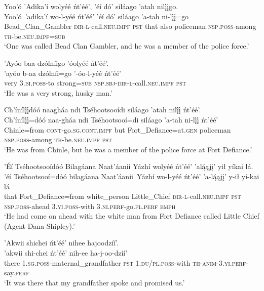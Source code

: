 \ea\label{ex:text1-17-3}
Yoo’ó ’Adika’í wolyéé ńt’éé’, ’éí dó’ siláago ’atah nilį́įgo.\\
\gll Yoo’ó~{’adika’í}	wo-l-yéé	ńt’éé’	’éí	dó’	siláago	’a-tah	ni-lį́į=go\\
     Bead\_Clan\_Gambler	\textsc{dir}-\textsc{l}-call.\textsc{neu}.\textsc{impf}	\textsc{pst}	that	also	policeman	\textsc{nsp}.\textsc{poss}-among	\textsc{th}-be.\textsc{neu}.\textsc{impf}=\textsc{sub}\\
\glt `One was called Bead Clan Gambler, and he was a member of the police force.'
\z

\ea\label{ex:text1-17-4}
’Ayóo baa dzólníigo ’óolyéé ńt’éé’.\\
\gll ’ayóo	b-aa	dzólníi=go	’-óo-l-yéé	ńt’éé’\\
     very	3.\textsc{bi}.\textsc{poss}-to	strong=\textsc{sub}	\textsc{nsp}.\textsc{sbj}-\textsc{dir}-\textsc{l}-call.\textsc{neu}.\textsc{impf}	\textsc{pst}\\
\glt `He was a very strong, husky man.'
\z

\newpage
\ea\label{ex:text1-17-5}
Ch’ínílį́į́dóó naagháa ndi Tséhootsooídi siláago ’atah nilį́į́ ńt’éé’.\\
\gll Ch’ínílį́į́=dóó	naa-gháa	ndi	Tséhootsooí=di	siláago	’a-tah	ni-lį́į́	ńt’éé’\\
     Chinle=from	\textsc{cont}-go.\textsc{sg}.\textsc{cont}.\textsc{impf}	but	Fort\_Defiance=at.\textsc{gen}	policeman	\textsc{nsp}.\textsc{poss}-among	\textsc{th}-be.\textsc{neu}.\textsc{impf}	\textsc{pst}\\
\glt `He was from Chinle, but he was a member of the police force at Fort Defiance.'
\z

\ea\label{ex:text1-17-6}
’Éí Tséhootsooídóó Bilagáana Naat’áanii Yázhí wolyéé ńt’éé’ ’alą́ąjį’ yił yíkai lá.\\
\gll ’éí	Tséhootsooí=dóó	bilagáana	Naat’áanii~{Yázhí}	wo-l-yéé	ńt’éé’	’a-lą́ąjį’	y-ił	yí-kai	lá\\
     that	Fort\_Defiance=from	white\_person	Little\_Chief	\textsc{dir}-\textsc{l}-call.\textsc{neu}.\textsc{impf}	\textsc{pst}	\textsc{nsp}.\textsc{poss}-ahead	3.\textsc{yi}.\textsc{poss}-with	3.\textsc{ni}.\textsc{perf}-go.\textsc{pl}.\textsc{perf}	\textsc{emph}\\
\glt `He had come on ahead with the white man from Fort Defiance called Little Chief (Agent Dana Shipley).'
\z

\ea\label{ex:text1-17-7}
’Akwii shichei ńt’éé’ nihee hajoodzíí’.\\
\gll ’akwii	shi-chei	ńt’éé’	nih-ee	ha-j-oo-dzíí’\\
     there	1.\textsc{sg}.\textsc{poss}-maternal\_grandfather	\textsc{pst}	1.\textsc{du}/\textsc{pl}.\textsc{poss}-with	\textsc{th}-\textsc{anim}-3.\textsc{yi}.\textsc{perf}-say.\textsc{perf}\\
\glt `It was there that my grandfather spoke and promised us.'
\z

